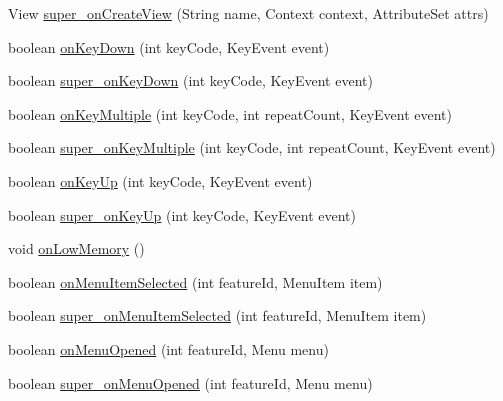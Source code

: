 \begin{DoxyCompactItemize}
\item 
View \hyperlink{classorg_1_1qtproject_1_1qt5_1_1android_1_1bindings_1_1_qt_activity_a4e054eb047b9531cc8abaa75039136f2}{super\-\_\-on\-Create\-View} (String name, Context context, Attribute\-Set attrs)
\item 
boolean \hyperlink{classorg_1_1qtproject_1_1qt5_1_1android_1_1bindings_1_1_qt_activity_ac1ee5a8d6b1ed5e7757139be8d7810be}{on\-Key\-Down} (int key\-Code, Key\-Event event)
\item 
boolean \hyperlink{classorg_1_1qtproject_1_1qt5_1_1android_1_1bindings_1_1_qt_activity_af7fbc3d78f28c7599fac81499717ac8d}{super\-\_\-on\-Key\-Down} (int key\-Code, Key\-Event event)
\item 
boolean \hyperlink{classorg_1_1qtproject_1_1qt5_1_1android_1_1bindings_1_1_qt_activity_a9b41df58aada132667b9af5a8aa01aa7}{on\-Key\-Multiple} (int key\-Code, int repeat\-Count, Key\-Event event)
\item 
boolean \hyperlink{classorg_1_1qtproject_1_1qt5_1_1android_1_1bindings_1_1_qt_activity_a108ba4840f9990f299beb44cced0a45d}{super\-\_\-on\-Key\-Multiple} (int key\-Code, int repeat\-Count, Key\-Event event)
\item 
boolean \hyperlink{classorg_1_1qtproject_1_1qt5_1_1android_1_1bindings_1_1_qt_activity_ac81bcf0a973ed2f8035bc3af8ee73f78}{on\-Key\-Up} (int key\-Code, Key\-Event event)
\item 
boolean \hyperlink{classorg_1_1qtproject_1_1qt5_1_1android_1_1bindings_1_1_qt_activity_a0e236df83e1edd02ba8587199fc47e05}{super\-\_\-on\-Key\-Up} (int key\-Code, Key\-Event event)
\item 
void \hyperlink{classorg_1_1qtproject_1_1qt5_1_1android_1_1bindings_1_1_qt_activity_a60dde1c5c76102c0514119fbc9515450}{on\-Low\-Memory} ()
\item 
boolean \hyperlink{classorg_1_1qtproject_1_1qt5_1_1android_1_1bindings_1_1_qt_activity_a15f3f492aba46975a36f1ebdfbe5ba45}{on\-Menu\-Item\-Selected} (int feature\-Id, Menu\-Item item)
\item 
boolean \hyperlink{classorg_1_1qtproject_1_1qt5_1_1android_1_1bindings_1_1_qt_activity_a054b8b51a53012f32a3d30bf395c18ca}{super\-\_\-on\-Menu\-Item\-Selected} (int feature\-Id, Menu\-Item item)
\item 
boolean \hyperlink{classorg_1_1qtproject_1_1qt5_1_1android_1_1bindings_1_1_qt_activity_afa718d6a5777a519b1d513d7cbda938a}{on\-Menu\-Opened} (int feature\-Id, Menu menu)
\item 
boolean \hyperlink{classorg_1_1qtproject_1_1qt5_1_1android_1_1bindings_1_1_qt_activity_ab1719c7260a5641289249620984077bd}{super\-\_\-on\-Menu\-Opened} (int feature\-Id, Menu menu)

\end{DoxyCompactItemize}
